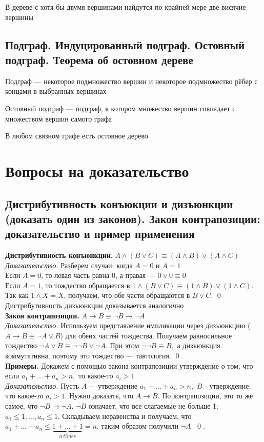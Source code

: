 \documentclass[a4paper]{article}
\begin{document}
\theorem В дереве с хотя бы двумя вершинами найдутся по крайней мере две висячие вершины


\subsection{Подграф. Индуцированный подграф. Остовный подграф. Теорема об остовном дереве}
 Подграф — некоторое подмножество вершин и некоторое подмножество рёбер с концами в выбранных вершинах

 Остовный подграф — подграф, в котором множество вершин совпадает с множеством вершин самого графа

\theorem В любом связном графе есть остовное дерево




\newpage
\section{Вопросы на доказательство}
\subsection{Дистрибутивность конъюкции и дизъюнкции (доказать один из законов). Закон контрапозиции: доказательство и пример применения}
\label{sec:2.1}\textbf{Дистрибутивность конъюнкции}. $A\wedge(B\vee C)\equiv(A\wedge B)\vee(A\wedge C)$\\[2mm]
\textit{Доказательство.} Разберем случаи: когда $A=0$ и $A=1$\\[2mm]
 Если $A=0$, то левая часть равна 0, а правая — $0\vee0\equiv0$\\[2mm]
 Если $A=1$, то тождество обращается в $1\wedge(B\vee C)\equiv(1\wedge B)\vee(1\wedge C)$. Так как  $1\wedge X=X$, получаем, что обе части обращаются в $B\vee C$. \qed\\[2mm]
Дистрибутивность дизъюнкции доказывается аналогично\\[2mm]
\textbf{Закон контрапозиции.} $A\rightarrow B\equiv\neg B\rightarrow\neg A$\\[2mm]
\textit{Доказательство.} Используем представление импликации через
дизъюнкцию ($A\rightarrow B\equiv\neg A\vee B$) для обеих частей тождества. Получаем равносильное тождество $\neg A\vee B\equiv\neg\neg B\vee\neg A.$ При этом $\neg\neg B\equiv B,$ а дизъюнкция коммутативна, поэтому это тождество — тавтология. \qed.\\[2mm]
\textbf{Примеры.} Докажем с помощью закона контрапозиции утверждение о том, что если $a_1+\ldots+a_n>n,$ то какое-то $a_i>1$\\[2mm]
\textit{Доказательство.} Пусть $A-$ утверждение $a_1+\ldots+a_n>n,$ $B$ - утверждение, что какое-то $a_i>1$. Нужно доказать, что $A\rightarrow B$. По контрапозиции, это то же самое, что $\neg B\rightarrow\neg A$. $\neg B$ означает, что все слагаемые не больше 1: $a_1\leqslant1,\ldots,a_n\leqslant1.$ Складываем неравенства и получаем, что $a_1+\ldots+a_n\leqslant\underbrace{1+\ldots+1}_{n\ times}=n.$ таким образом получили $\neg A$. \qed.
\end{document}
